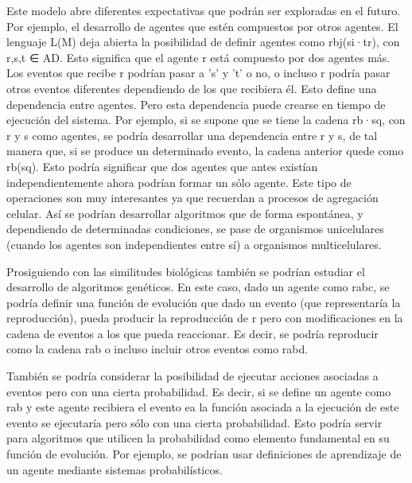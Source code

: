 \documentclass[runningheads]{llncs}
\begin{document}
	Este modelo abre diferentes expectativas que podrán ser exploradas en el futuro. Por ejemplo, el desarrollo de agentes que estén compuestos por otros agentes. El lenguaje L(M) deja abierta la posibilidad de definir agentes como rbj(si·tr), con r,s,t ∈ AD. Esto significa que el agente r está compuesto por dos agentes más. Los eventos que recibe r podrían pasar a 's' y 't' o no, o incluso r podría pasar otros eventos diferentes dependiendo de los que recibiera él. Esto define una dependencia entre agentes. Pero esta dependencia puede crearse en tiempo de ejecución del sistema. Por ejemplo, si se supone que se tiene la cadena rb·sq, con r y s como agentes, se podría desarrollar una dependencia entre r y s, de tal manera que, si se produce un determinado evento, la cadena anterior quede como rb(sq). Esto podría significar que dos agentes que antes existían independientemente ahora podrían formar un sólo agente. Este tipo de operaciones son muy interesantes ya que recuerdan a procesos de agregación celular. Así se podrían desarrollar algoritmos que de forma espontánea, y dependiendo de determinadas condiciones, se pase de organismos unicelulares (cuando los agentes son independientes entre sí) a organismos multicelulares.
	
	Prosiguiendo con las similitudes biológicas también se podrían estudiar el desarrollo de algoritmos genéticos. En este caso, dado un agente como rabc, se podría definir una función de evolución que dado un evento (que representaría la reproducción), pueda producir la reproducción de r pero con modificaciones en la cadena de eventos a los que pueda reaccionar. Es decir, se podría reproducir como la cadena  rab o incluso incluir otros eventos como rabd.
	
	También se podría considerar la posibilidad de ejecutar acciones asociadas a eventos pero con una cierta probabilidad. Es decir, si se define un agente como rab y este agente recibiera el evento ea la función asociada a la ejecución de este evento se ejecutaría pero sólo con una cierta probabilidad. Esto podría servir para algoritmos que utilicen la probabilidad como elemento fundamental en su función de evolución. Por ejemplo, se podrían usar definiciones de aprendizaje de un agente mediante sistemas probabilísticos.
	
\end{document}
